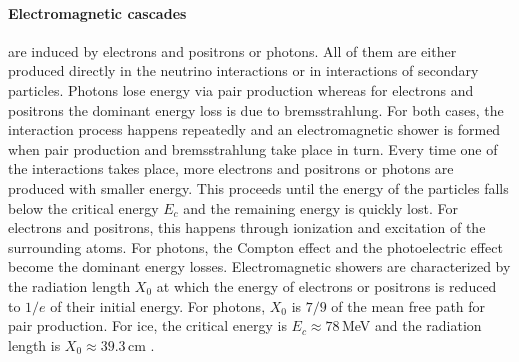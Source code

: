 \paragraph{Electromagnetic cascades} are induced by electrons and positrons or photons.
All of them are either produced directly in the neutrino interactions or in interactions of secondary particles.
Photons lose energy via pair production whereas for electrons and positrons the dominant energy loss is due to bremsstrahlung.
For both cases, the interaction process happens repeatedly and an electromagnetic shower is formed when pair production and bremsstrahlung take place in turn.
Every time one of the interactions takes place, more electrons and positrons or photons are produced with smaller energy. 
This proceeds until the energy of the particles falls below the critical energy $E_c$ and the remaining energy is quickly lost.
For electrons and positrons, this happens through ionization and excitation of the surrounding atoms.
For photons, the Compton effect and the photoelectric effect become the dominant energy losses.
Electromagnetic showers are characterized by the radiation length $X_0$ at which the energy of electrons or positrons is reduced to $1/e$ of their initial energy.
For photons, $X_0$ is $7/9$ of the mean free path for pair production. For ice, the critical energy is $E_c \approx 78$\,MeV and the radiation length is $X_0 \approx 39.3$\,cm \cite{PhysRevD.98.030001}.

